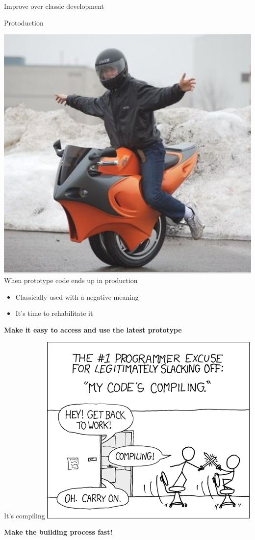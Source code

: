\documentclass[presentation]{beamer}
\begin{document}
\begin{frame}{Improve over classic development}
	\begin{block}{Protoduction \cite{jargon}}
		\begin{center}
			\includegraphics[width=.25\textwidth]{images/protoduction} \\
			When prototype code ends up in production
		\end{center}
		\begin{itemize}
			\item Classically used with a negative meaning
			\item It's time to rehabilitate it
		\end{itemize}
		\textbf{Make it easy to access and use the latest prototype}
	\end{block}
	\begin{block}{It's compiling \cite{xkcd303}}
		\centering
		\includegraphics[width=.49\textwidth]{images/compiling}

		\textbf{Make the building process fast!}
	\end{block}
\end{frame}
\end{document}
